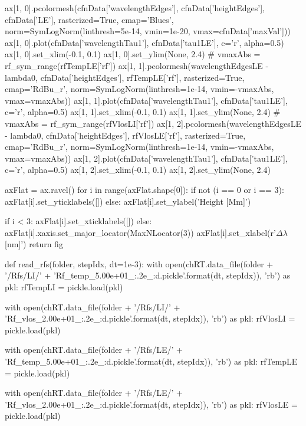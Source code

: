 \begin{pycode}[TimeDepRT]
    ax[1, 0].pcolormesh(cfnData['wavelengthEdges'], cfnData['heightEdges'], cfnData['LE'],
                        rasterized=True, cmap='Blues',
                        norm=SymLogNorm(linthresh=5e-14, vmin=1e-20, vmax=cfnData['maxVal']))
    ax[1, 0].plot(cfnData['wavelengthTau1'], cfnData['tau1LE'], c='r', alpha=0.5)
    ax[1, 0].set_xlim(-0.1, 0.1)
    ax[1, 0].set_ylim(None, 2.4)
    # vmaxAbs = rf_sym_range(rfTempLE['rf'])
    ax[1, 1].pcolormesh(wavelengthEdgesLE - lambda0, cfnData['heightEdges'], rfTempLE['rf'],
                        rasterized=True, cmap='RdBu_r',
                        norm=SymLogNorm(linthresh=1e-14, vmin=-vmaxAbs, vmax=vmaxAbs))
    ax[1, 1].plot(cfnData['wavelengthTau1'], cfnData['tau1LE'], c='r', alpha=0.5)
    ax[1, 1].set_xlim(-0.1, 0.1)
    ax[1, 1].set_ylim(None, 2.4)
    # vmaxAbs = rf_sym_range(rfVlosLI['rf'])
    ax[1, 2].pcolormesh(wavelengthEdgesLE - lambda0, cfnData['heightEdges'], rfVlosLE['rf'],
                        rasterized=True, cmap='RdBu_r',
                        norm=SymLogNorm(linthresh=1e-14, vmin=-vmaxAbs, vmax=vmaxAbs))
    ax[1, 2].plot(cfnData['wavelengthTau1'], cfnData['tau1LE'], c='r', alpha=0.5)
    ax[1, 2].set_xlim(-0.1, 0.1)
    ax[1, 2].set_ylim(None, 2.4)

    axFlat = ax.ravel()
    for i in range(axFlat.shape[0]):
        if not (i == 0 or i == 3):
            axFlat[i].set_yticklabels([])
        else:
            axFlat[i].set_ylabel('Height [Mm]')

        if i < 3:
            axFlat[i].set_xticklabels([])
        else:
            axFlat[i].xaxis.set_major_locator(MaxNLocator(3))
            axFlat[i].set_xlabel(r'$\Delta\lambda$ [nm]')
    return fig

def read_rfs(folder, stepIdx, dt=1e-3):
    with open(chRT.data_file(folder + '/Rfs/LI/' + 'Rf_temp_5.00e+01_{:.2e}_{:d}.pickle'.format(dt, stepIdx)), 'rb') as pkl:
        rfTempLI = pickle.load(pkl)

    with open(chRT.data_file(folder + '/Rfs/LI/' + 'Rf_vlos_2.00e+01_{:.2e}_{:d}.pickle'.format(dt, stepIdx)), 'rb') as pkl:
        rfVlosLI = pickle.load(pkl)

    with open(chRT.data_file(folder + '/Rfs/LE/' + 'Rf_temp_5.00e+01_{:.2e}_{:d}.pickle'.format(dt, stepIdx)), 'rb') as pkl:
        rfTempLE = pickle.load(pkl)

    with open(chRT.data_file(folder + '/Rfs/LE/' + 'Rf_vlos_2.00e+01_{:.2e}_{:d}.pickle'.format(dt, stepIdx)), 'rb') as pkl:
        rfVlosLE = pickle.load(pkl)


\end{pycode}
